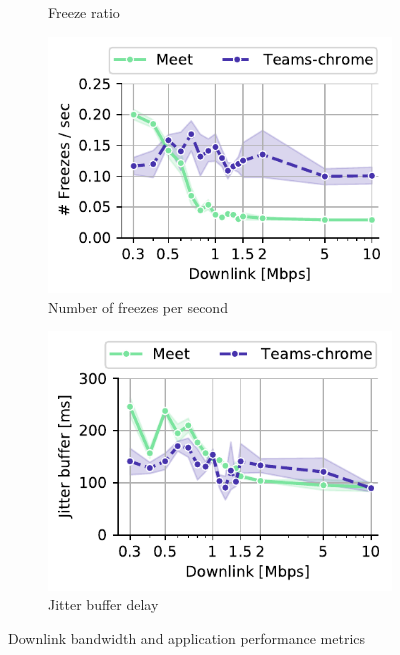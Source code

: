 \begin{figure}[]
\begin{subfigure}[t]{0.3\textwidth}
        \vspace{-2em}
        \caption{Freeze ratio}
 		\label{subfig:downlink_freeze_ratio}
    \end{subfigure}%
    \hfill
	\begin{subfigure}[t]{0.3\textwidth}   
        \centering
        \includegraphics[width=\textwidth]{figures/static/downlink_freezeCountPerSecond.pdf}
        \vspace{-2em}
    \caption{Number of freezes per second}
    \label{subfig:downlink_freeze_per_sec}
    \end{subfigure}%
    \hfill
	\begin{subfigure}[t]{0.3\textwidth}   
        \centering
        \includegraphics[width=\textwidth]{figures/static/downlink_jitter_buffer.pdf}
        \vspace{-2em}
    \caption{Jitter buffer delay}
    \label{subfig:downlink_jitter_buffer}
    \end{subfigure}
	\vspace{-1em}
	\caption{Downlink bandwidth and application performance metrics}
	\label{fig:downlink_application}
\end{figure}


